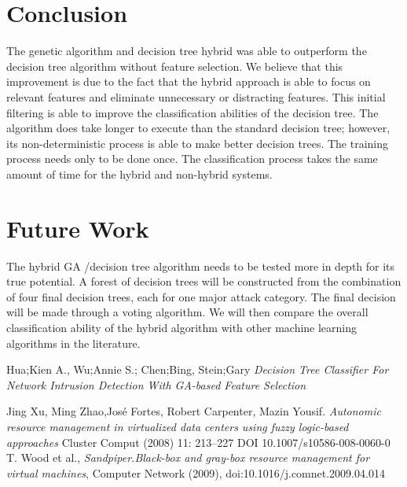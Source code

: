 \documentclass[conference]{IEEEtran}
\begin{document}
\section{Conclusion}
The genetic algorithm and decision tree hybrid was able to
outperform the decision tree algorithm without feature selection.
We believe that this improvement is due to the fact that the
hybrid approach is able to focus on relevant features and
eliminate unnecessary or distracting features. This initial filtering
is able to improve the classification abilities of the decision tree.
The algorithm does take longer to execute than the standard
decision tree; however, its non-deterministic process is able to
make better decision trees. The training process needs only to be
done once. The classification process takes the same amount of
time for the hybrid and non-hybrid systems.

\section{Future Work}
The hybrid GA /decision tree algorithm needs to be tested more
in depth for its true potential. A forest of decision trees will be
constructed from the combination of four final decision trees,
each for one major attack category. The final decision will be
made through a voting algorithm. We will then compare the
overall classification ability of the hybrid algorithm with other
machine learning algorithms in the literature.


\begin{thebibliography}{1}

Hua;Kien A., Wu;Annie S.; Chen;Bing, Stein;Gary
\emph{Decision Tree Classifier For Network Intrusion Detection
With GA-based Feature Selection}

Jing Xu, Ming Zhao,José Fortes, Robert Carpenter,
Mazin Yousif. \emph{Autonomic resource management in virtualized data centers using
fuzzy logic-based approaches} Cluster Comput (2008) 11: 213–227
DOI 10.1007/s10586-008-0060-0
T. Wood et al., \emph{Sandpiper.Black-box and gray-box resource management for virtual machines}, Computer Network (2009), doi:10.1016/j.comnet.2009.04.014
\end{thebibliography}
\end{document}
